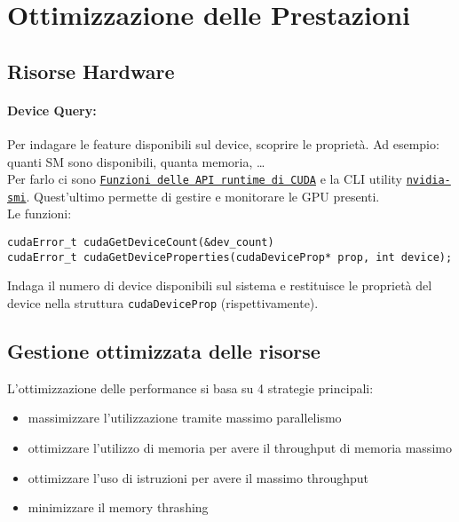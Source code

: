 \section{Ottimizzazione delle Prestazioni}

\subsection{Risorse Hardware}

\paragraph{Device Query:} Per indagare le feature disponibili sul device, scoprire le proprietà. Ad esempio: quanti SM sono disponibili, quanta memoria, \dots\\

Per farlo ci sono \href{http://docs.nvidia.com/cuda/cuda-runtime-api}{\texttt{Funzioni delle API runtime di CUDA}} e la CLI utility \href{https://developer.nvidia.com/nvidia-system-management-interface}{\texttt{nvidia-smi}}. Quest'ultimo permette di gestire e monitorare le GPU presenti.\\

Le funzioni: 
\begin{center}
	\texttt{cudaError\_t cudaGetDeviceCount(\&dev\_count)} \\
	\texttt{cudaError\_t cudaGetDeviceProperties(cudaDeviceProp* prop, int device);}
\end{center}
Indaga il numero di device disponibili sul sistema e restituisce le proprietà del device nella struttura \texttt{cudaDeviceProp} (rispettivamente).\\

\subsection{Gestione ottimizzata delle risorse}

L'ottimizzazione delle performance si basa su 4 strategie principali:
\begin{itemize}
	\item massimizzare l'utilizzazione tramite massimo parallelismo
	\item ottimizzare l'utilizzo di memoria per avere il throughput di memoria massimo
	\item ottimizzare l'uso di istruzioni per avere il massimo throughput
	\item minimizzare il memory thrashing
\end{itemize}

